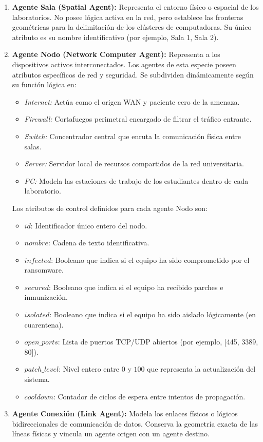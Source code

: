 \begin{enumerate}
    \item \textbf{Agente Sala (Spatial Agent):} Representa el entorno físico o espacial de los laboratorios. No posee lógica activa en la red, pero establece las fronteras geométricas para la delimitación de los clústeres de computadoras. Su único atributo es su nombre identificativo (por ejemplo, Sala 1, Sala 2).
    \item \textbf{Agente Nodo (Network Computer Agent):} Representa a los dispositivos activos interconectados. Los agentes de esta especie poseen atributos específicos de red y seguridad. Se subdividen dinámicamente según su función lógica en:
    \begin{itemize}
        \item \textit{Internet:} Actúa como el origen WAN y paciente cero de la amenaza.
        \item \textit{Firewall:} Cortafuegos perimetral encargado de filtrar el tráfico entrante.
        \item \textit{Switch:} Concentrador central que enruta la comunicación física entre salas.
        \item \textit{Server:} Servidor local de recursos compartidos de la red universitaria.
        \item \textit{PC:} Modela las estaciones de trabajo de los estudiantes dentro de cada laboratorio.
    \end{itemize}
    Los atributos de control definidos para cada agente Nodo son:
    \begin{itemize}
        \item $id$: Identificador único entero del nodo.
        \item $nombre$: Cadena de texto identificativa.
        \item $infected$: Booleano que indica si el equipo ha sido comprometido por el ransomware.
        \item $secured$: Booleano que indica si el equipo ha recibido parches e inmunización.
        \item $isolated$: Booleano que indica si el equipo ha sido aislado lógicamente (en cuarentena).
        \item $open\_ports$: Lista de puertos TCP/UDP abiertos (por ejemplo, [445, 3389, 80]).
        \item $patch\_level$: Nivel entero entre $0$ y $100$ que representa la actualización del sistema.
        \item $cooldown$: Contador de ciclos de espera entre intentos de propagación.
    \end{itemize}
    \item \textbf{Agente Conexión (Link Agent):} Modela los enlaces físicos o lógicos bidireccionales de comunicación de datos. Conserva la geometría exacta de las líneas físicas y vincula un agente origen con un agente destino.
\end{enumerate}


